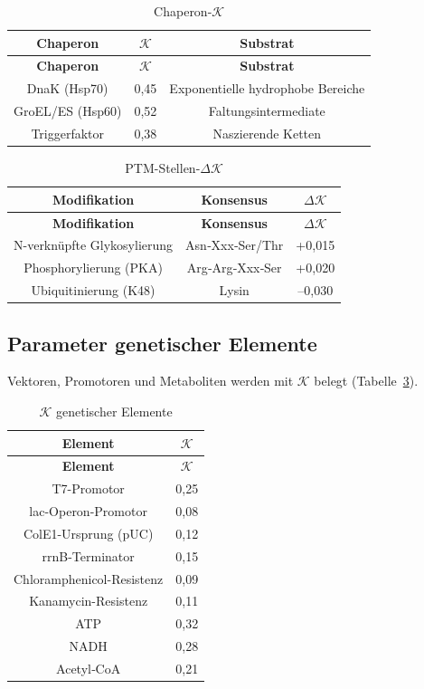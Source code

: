 \documentclass[12pt,a4paper]{article}
\newcommand{\REL}{\mathcal{K}}          %
\begin{document}
	\begin{longtable}{|c|c|c|}
		\caption{Chaperon-\(\REL\)}\label{tab:chaperones}\\
		\hline
		\textbf{Chaperon} & \(\REL\) & \textbf{Substrat} \\
		\hline
		\endfirsthead
		\hline
		\textbf{Chaperon} & \(\REL\) & \textbf{Substrat} \\
		\hline
		\endhead
		\hline
		DnaK (Hsp70) & 0,45 & Exponentielle hydrophobe Bereiche \\
		GroEL/ES (Hsp60) & 0,52 & Faltungsintermediate \\
		Triggerfaktor & 0,38 & Naszierende Ketten \\
		\hline
	\end{longtable}
	
	\begin{longtable}{|c|c|c|}
		\caption{PTM-Stellen-\(\Delta \REL\)}\label{tab:ptm}\\
		\hline
		\textbf{Modifikation} & \textbf{Konsensus} & \(\Delta \REL\) \\
		\hline
		\endfirsthead
		\hline
		\textbf{Modifikation} & \textbf{Konsensus} & \(\Delta \REL\) \\
		\hline
		\endhead
		\hline
		N-verknüpfte Glykosylierung & Asn‑Xxx‑Ser/Thr & +0,015 \\
		Phosphorylierung (PKA) & Arg‑Arg‑Xxx‑Ser & +0,020 \\
		Ubiquitinierung (K48) & Lysin & –0,030 \\
		\hline
	\end{longtable}
	
	\subsection{Parameter genetischer Elemente}
	Vektoren, Promotoren und Metaboliten werden mit \(\REL\) belegt (Tabelle~\ref{tab:elements}).
	
	\begin{longtable}{|c|c|}
		\caption{\(\REL\) genetischer Elemente}\label{tab:elements}\\
		\hline
		\textbf{Element} & \(\REL\) \\
		\hline
		\endfirsthead
		\hline
		\textbf{Element} & \(\REL\) \\
		\hline
		\endhead
		\hline
		T7-Promotor & 0,25 \\
		lac-Operon-Promotor & 0,08 \\
		ColE1-Ursprung (pUC) & 0,12 \\
		rrnB-Terminator & 0,15 \\
		Chloramphenicol-Resistenz & 0,09 \\
		Kanamycin-Resistenz & 0,11 \\
		ATP & 0,32 \\
		NADH & 0,28 \\
		Acetyl‑CoA & 0,21 \\
		\hline
	\end{longtable}
	
\end{document}
